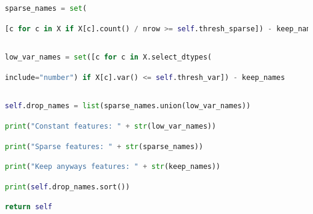\documentclass[
  11pt,
  a4paper,
  DIV=12,captions=tableheading,oneside]{scrbook}
\begin{document}
\begin{lstlisting}[language=Python,stepnumber=2,basicstyle=\footnotesize]
\end{lstlisting}
\begin{lstlisting}[language=Python,stepnumber=2,basicstyle=\footnotesize]
        sparse_names = set(\end{lstlisting}
\begin{lstlisting}[language=Python,stepnumber=2,basicstyle=\footnotesize]
            [c for c in X if X[c].count() / nrow >= self.thresh_sparse]) - keep_names\end{lstlisting}
\begin{lstlisting}[language=Python,stepnumber=2,basicstyle=\footnotesize]
\end{lstlisting}
\begin{lstlisting}[language=Python,stepnumber=2,basicstyle=\footnotesize]
        low_var_names = set([c for c in X.select_dtypes(\end{lstlisting}
\begin{lstlisting}[language=Python,stepnumber=2,basicstyle=\footnotesize]
            include="number") if X[c].var() <= self.thresh_var]) - keep_names\end{lstlisting}
\begin{lstlisting}[language=Python,stepnumber=2,basicstyle=\footnotesize]
\end{lstlisting}
\begin{lstlisting}[language=Python,stepnumber=2,basicstyle=\footnotesize]
        self.drop_names = list(sparse_names.union(low_var_names))\end{lstlisting}
\begin{lstlisting}[language=Python,stepnumber=2,basicstyle=\footnotesize]
        print("Constant features: " + str(low_var_names))\end{lstlisting}
\begin{lstlisting}[language=Python,stepnumber=2,basicstyle=\footnotesize]
        print("Sparse features: " + str(sparse_names))\end{lstlisting}
\begin{lstlisting}[language=Python,stepnumber=2,basicstyle=\footnotesize]
        print("Keep anyways features: " + str(keep_names))\end{lstlisting}
\begin{lstlisting}[language=Python,stepnumber=2,basicstyle=\footnotesize]
        print(self.drop_names.sort())\end{lstlisting}
\begin{lstlisting}[language=Python,stepnumber=2,basicstyle=\footnotesize]
        return self\end{lstlisting}
\end{document}
